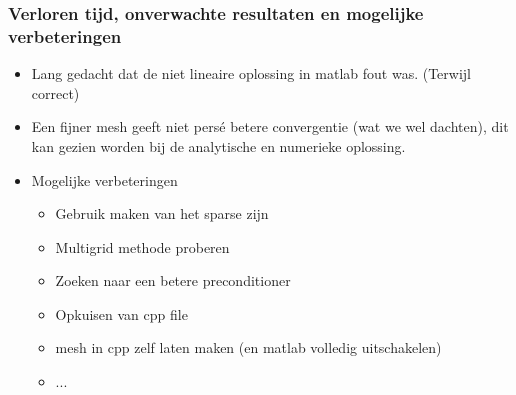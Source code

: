 \documentclass{beamer}
\begin{document}
\begin{frame}
\frametitle{Verloren tijd, onverwachte resultaten en mogelijke verbeteringen}
\begin{itemize}
\item Lang gedacht dat de niet lineaire oplossing in matlab fout was. (Terwijl correct)
\item Een fijner mesh geeft niet persé betere convergentie (wat we wel dachten), dit kan gezien worden bij de analytische en numerieke oplossing.
\item Mogelijke verbeteringen
\begin{itemize}
\item Gebruik maken van het sparse zijn
\item Multigrid methode proberen
\item Zoeken naar een betere preconditioner
\item Opkuisen van cpp file
\item mesh in cpp zelf laten maken (en matlab volledig uitschakelen)
\item ...
\end{itemize}
\end{itemize}
\end{frame}
\end{document}
